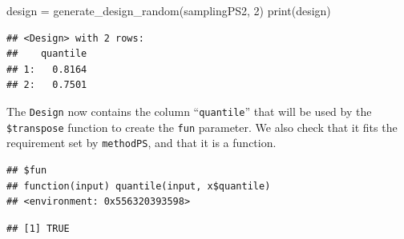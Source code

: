 \documentclass[
]{scrbook}
\newenvironment{Shaded}{\begin{snugshade}}{\end{snugshade}}
\newcommand{\DecValTok}[1]{\textcolor[rgb]{0.00,0.00,0.81}{#1}}
\newcommand{\FunctionTok}[1]{\textcolor[rgb]{0.00,0.00,0.00}{#1}}
\newcommand{\NormalTok}[1]{#1}
\newcommand{\OtherTok}[1]{\textcolor[rgb]{0.56,0.35,0.01}{#1}}
\newcommand{\SpecialCharTok}[1]{\textcolor[rgb]{0.00,0.00,0.00}{#1}}
\renewenvironment{Shaded} {\begin{snugshade}\small} {\end{snugshade}}
\begin{document}
\begin{Shaded}
\begin{Highlighting}[]
\NormalTok{design }\OtherTok{=} \FunctionTok{generate\_design\_random}\NormalTok{(samplingPS2, }\DecValTok{2}\NormalTok{)}
\FunctionTok{print}\NormalTok{(design)}
\end{Highlighting}
\end{Shaded}

\begin{verbatim}
## <Design> with 2 rows:
##    quantile
## 1:   0.8164
## 2:   0.7501
\end{verbatim}

The \texttt{Design} now contains the column ``\texttt{quantile}'' that will be used by the \texttt{\$transpose} function to create the \texttt{fun} parameter.
We also check that it fits the requirement set by \texttt{methodPS}, and that it is a function.

\begin{Shaded}
\end{Shaded}

\begin{verbatim}
## $fun
## function(input) quantile(input, x$quantile)
## <environment: 0x556320393598>
\end{verbatim}

\begin{Shaded}
\end{Shaded}

\begin{verbatim}
## [1] TRUE
\end{verbatim}

\begin{Shaded}
\end{Shaded}
\end{document}
